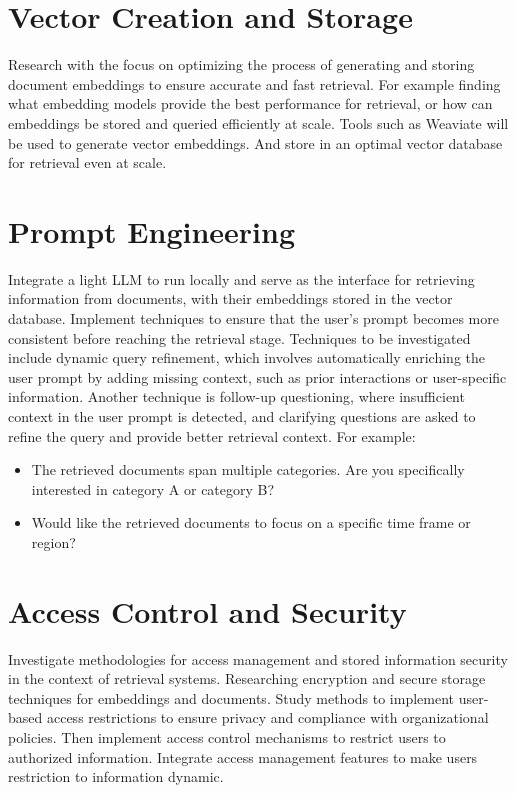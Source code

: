 \section{Vector Creation and Storage}
Research with the focus on optimizing the process of generating and storing document embeddings to ensure accurate and fast retrieval. For example finding what embedding models provide the best performance for retrieval, or how can embeddings be stored and queried efficiently at scale.
Tools such as Weaviate will be used to generate vector embeddings. And store in an optimal vector database for retrieval even at scale.

\section{Prompt Engineering}
Integrate a light \ac{LLM} to run locally and serve as the interface for retrieving information from documents, with their embeddings stored in the vector database. Implement techniques to ensure that the user's prompt becomes more consistent before reaching the retrieval stage. Techniques to be investigated include dynamic query refinement, which involves automatically enriching the user prompt by adding missing context, such as prior interactions or user-specific information. Another technique is follow-up questioning, where insufficient context in the user prompt is detected, and clarifying questions are asked to refine the query and provide better retrieval context. For example:
\begin{itemize}
    \item The retrieved documents span multiple categories. Are you specifically interested in category A or category B?
    \item Would like the retrieved documents to focus on a specific time frame or region?
\end{itemize}

\section{Access Control and Security}
Investigate methodologies for access management and stored information security in the context of retrieval systems. Researching encryption and secure storage techniques for embeddings and documents. Study methods to implement user-based access restrictions to ensure privacy and compliance with organizational policies.
Then implement access control mechanisms to restrict users to authorized information. Integrate access management features to make users restriction to information dynamic.

